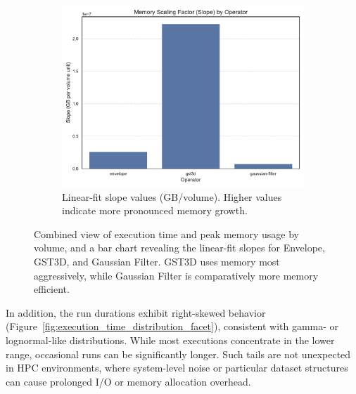 \begin{figure}[htbp]
    \begin{subfigure}[t]{0.49\textwidth}
        \centering
        \includegraphics[width=\textwidth]{assets/images/05/cross_operator_memory_scaling_factor}
        \caption{
            Linear-fit slope values (GB/volume). Higher values indicate more pronounced memory growth.
        }
    \end{subfigure}
    \caption{Combined view of execution time and peak memory usage by volume, and a bar chart revealing the linear-fit slopes for Envelope, \ac{GST3D}, and Gaussian Filter. \ac{GST3D} uses memory most aggressively, while Gaussian Filter is comparatively more memory efficient.}
    \label{fig:ex_peak_mu_facet}
\end{figure}

In addition, the run durations exhibit right-skewed behavior (Figure~\ref{fig:execution_time_distribution_facet}), consistent with gamma- or lognormal-like distributions. 
While most executions concentrate in the lower range, occasional runs can be significantly longer.
Such tails are not unexpected in \ac{HPC} environments, where system-level noise or particular dataset structures can cause prolonged I/O or memory allocation overhead.

